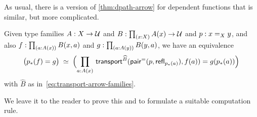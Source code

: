 As usual, there is a version of \cref{thm:dpath-arrow} for dependent functions that is similar, but more complicated.

\begin{lem}\label{thm:dpath-forall}
  Given type families $A:X\to\type$ and $B:\prd{x:X} A(x)\to\type$ and $p:\id[X]xy$, and also $f:\prd{a:A(x)} B(x,a)$ and $g:\prd{a:A(y)} B(y,a)$, we have an equivalence
  \[ \eqvspaced{ \big(\trans{p}{f} = {g}\big) } { \Parens{\prd{a:A(x)}  \transfib{\widehat{B}}{\pairpath(p,\refl{\trans pa})}{f(a)} = g(\trans{p}{a}) } } \]
  with $\widehat{B}$ as in~\eqref{eq:transport-arrow-families}.
\end{lem}

We leave it to the reader to prove this and to formulate a suitable computation rule.

%
%
%